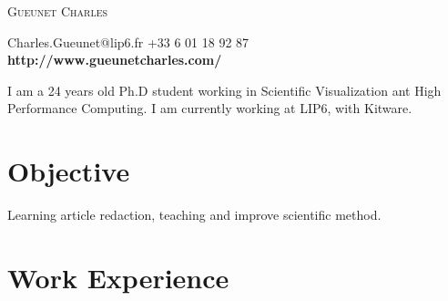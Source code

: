 \documentclass[a4paper, oneside, final]{scrartcl} %
\begin{document}
\begin{center} %


{\fontsize{36}{36}\selectfont\scshape
Gueunet Charles} %

{\Large\Letter} Charles.Gueunet@lip6.fr \hspace{0.2cm} {\Large\Telefon} +33 6 01 18 92 87 \\
\textbf{http://www.gueunetcharles.com/}


\vspace{0.2cm} %


\begin{flushleft}
  I am a 24 years old Ph.D student working in Scientific Visualization ant High Performance Computing.
  I am currently working at LIP6, with Kitware.
\end{flushleft}


\section{Objective}

Learning article redaction, teaching and improve scientific method.


\section{Work Experience}


\end{center}
\end{document}
